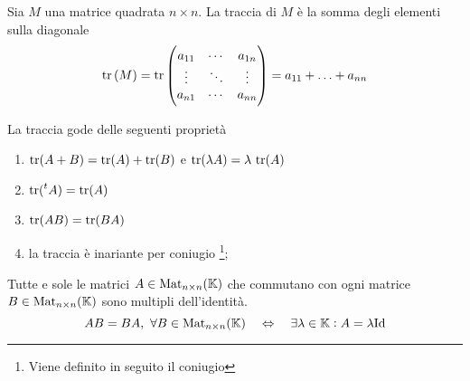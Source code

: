 
\begin{definition}[Traccia]
	Sia $ M $ una matrice quadrata $ n \times n $. La traccia di $ M $ è la somma degli elementi sulla diagonale 
	\[\operatorname{tr}{(M)} = \operatorname{tr}{ 
	\begin{pmatrix}
	a_{11} & \cdots  & a_{1n} \\
	\vdots & \ddots & \vdots \\
	a_{n1} & \cdots  & a_{nn} \\
	\end{pmatrix}}
	= a_{11} + \ldots + a_{nn}\]
\end{definition}

\begin{propriety}
	La traccia gode delle seguenti proprietà
	\begin{enumerate}[label=(\roman*)]
		\item $ \operatorname{tr} (A + B) = \operatorname{tr}(A) + \operatorname{tr}(B) $ e $ \operatorname{tr}(\lambda A) = \lambda \, \operatorname{tr} (A) $
		\item $ \operatorname{tr}(\prescript{t}{}{A}) = \operatorname{tr} (A) $
		\item $ \operatorname{tr} (AB) = \operatorname{tr} (BA) $
		\item la traccia è inariante per coniugio
			\footnote{Viene definito in seguito il coniugio};
	\end{enumerate}
\end{propriety}



\begin{fatto}
	Tutte e sole le matrici $ A \in \mathrm{Mat}_{n \times n}(\mathbb{K}) $ che commutano con ogni matrice $ B \in  \mathrm{Mat}_{n \times n}(\mathbb{K}) $ sono multipli dell'identità. \[AB = BA, \ \forall B \in \mathrm{Mat}_{n \times n}(\K) \quad \iff \quad \exists \lambda \in \K : A = \lambda \Id\]
\end{fatto}
